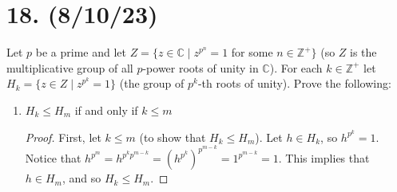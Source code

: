 \documentclass{article}
\begin{document}
\section*{18. (8/10/23)}

Let $p$ be a prime and let $Z = \{ z \in \mathbb{C} \mid z^{p^n} = 1$ for some $n \in \mathbb{Z}^+ \}$ (so $Z$ is the multiplicative group of all $p$-power roots of unity in $\mathbb{C}$). For each $k \in \mathbb{Z}^+$ let $H_k = \{ z \in Z \mid z^{p^k} = 1 \}$ (the group of $p^k$-th roots of unity). Prove the following:

\begin{enumerate}[label=(\alph*), itemsep=0em]
    \item $H_k \leq H_m$ if and only if $k \leq m$
          \begin{proof}
            First, let $k \leq m$ (to show that $H_k \leq H_m$). Let $h \in H_k$, so $h^{p^k} = 1$. Notice that $h^{p^m} = h^{p^k p^{m - k}} = (h^{p^k})^{p^{m - k}} = 1^{p^{m - k}} = 1$. This implies that $h \in H_m$, and so $H_k \leq H_m$.


\end{proof}
\end{enumerate}
\end{document}
